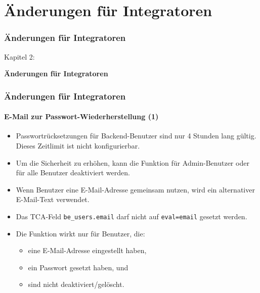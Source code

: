 %

\section{Änderungen für Integratoren}
\begin{frame}[fragile]
	\frametitle{Änderungen für Integratoren}

	\begin{center}\huge{Kapitel 2:}\end{center}
	\begin{center}\huge{\color{typo3darkgrey}\textbf{Änderungen für Integratoren}}\end{center}

\end{frame}


\begin{frame}[fragile]
	\frametitle{Änderungen für Integratoren}
	\framesubtitle{E-Mail zur Passwort-Wiederherstellung (1)}

	\begin{itemize}

		\item Passwortrücksetzungen für Backend-Benutzer sind nur 4 Stunden lang gültig. Dieses Zeitlimit ist nicht konfigurierbar.
		\item Um die Sicherheit zu erhöhen, kann die Funktion für Admin-Benutzer oder für alle Benutzer deaktiviert werden.
		\item Wenn Benutzer eine E-Mail-Adresse gemeinsam nutzen, wird ein alternativer E-Mail-Text verwendet.
		\item Das TCA-Feld \texttt{be\_users.email} darf nicht auf \texttt{eval=email} gesetzt werden.

		\item Die Funktion wirkt nur für Benutzer, die:
			\begin{itemize}
				\item eine E-Mail-Adresse eingestellt haben,
				\item ein Passwort gesetzt haben, und
				\item sind nicht deaktiviert/gelöscht.
			\end{itemize}

	\end{itemize}

\end{frame}

